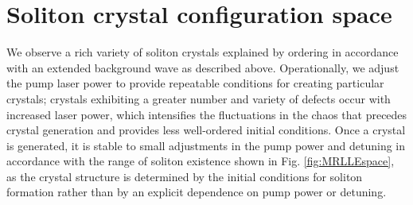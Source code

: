  
\section{Soliton crystal configuration space}\label{sec:SCtaxonomy}

We observe a rich variety of soliton crystals explained by ordering in accordance with an extended background wave as described above. Operationally, we adjust the pump laser power to provide repeatable conditions for creating particular crystals; crystals exhibiting a greater number and variety of defects occur with increased laser power, which intensifies the fluctuations in the chaos that precedes crystal generation and provides less well-ordered initial conditions. Once a crystal is generated, it is stable to small adjustments in the pump power and detuning in accordance with the range of soliton existence shown in Fig. \ref{fig:MRLLEspace}, as the crystal structure is determined by the initial conditions for soliton formation rather than by an explicit dependence on pump power or detuning. 

